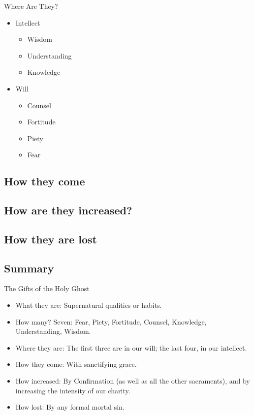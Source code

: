 \documentclass{beamer}
\begin{document}
\begin{frame}{Where Are They?}

\begin{itemize}
\item Intellect
\begin{itemize}
\item <2->Wisdom
\item <3->Understanding
\item <4->Knowledge
\end{itemize}
\item Will
\begin{itemize}
\item <5->Counsel
\item <5->Fortitude
\item <5->Piety
\item <5->Fear
\end{itemize}
\end{itemize}
\end{frame}

\subsection{How they come}

\subsection{How are they increased?}

\subsection{How they are lost}

\subsection{Summary}

\begin{frame}{The Gifts of the Holy Ghost}

  \begin{itemize}
  \item
    What they are: \pause Supernatural qualities or habits.
  \item
    How many? \pause Seven: Fear, Piety, Fortitude, Counsel, Knowledge, Understanding,
Wisdom.
  \item
    Where they are: \pause The first three are in our will; the last four, in our intellect.
  \item
    How they come: \pause With sanctifying grace.
  \item
    How increased: \pause By Confirmation (as well as all the other sacraments), and by increasing
the intensity of our charity.
  \item
    How lost: \pause
By any formal mortal sin.
  \end{itemize}
\end{frame}
\end{document}
